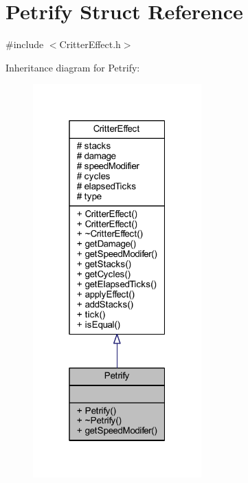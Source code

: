 \hypertarget{struct_petrify}{\section{Petrify Struct Reference}
\label{struct_petrify}
}


{\ttfamily \#include $<$Critter\+Effect.\+h$>$}



Inheritance diagram for Petrify\+:
\nopagebreak
\begin{figure}[H]
\begin{center}
\leavevmode
\includegraphics[width=184pt]{struct_petrify__inherit__graph}
\end{center}
\end{figure}


